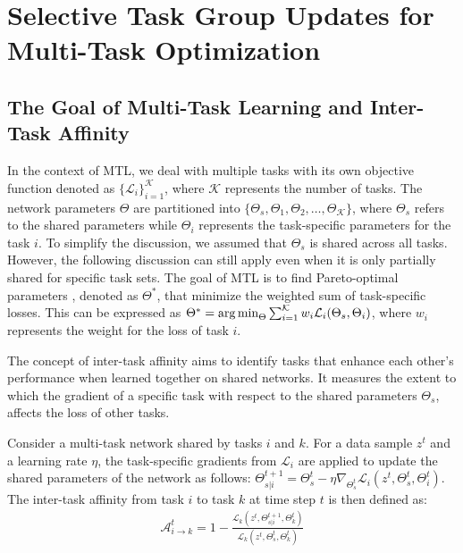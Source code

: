 \section{Selective Task Group Updates for Multi-Task Optimization}
\subsection{The Goal of Multi-Task Learning and Inter-Task Affinity}
\label{sec:problem_def}
In the context of MTL, we deal with multiple tasks with its own objective function denoted as $\{\mathcal{L}_i\}_{i=1}^{\mathcal{K}}$, where $\mathcal{K}$ represents the number of tasks. The network parameters $\Theta$ are partitioned into $\{\Theta_s, \Theta_1, \Theta_2, \ldots, \Theta_\mathcal{K}\}$, where $\Theta_s$ refers to the shared parameters while $\Theta_i$ represents the task-specific parameters for the task $i$. To simplify the discussion, we assumed that $\Theta_s$ is shared across all tasks. However, the following discussion can still apply even when it is only partially shared for specific task sets. The goal of MTL is to find Pareto-optimal parameters \citep{RN36}, denoted as $\Theta^*$, that minimize the weighted sum of task-specific losses. This can be expressed as $\Theta^* = \operatorname*{arg\,min}_{\Theta}\sum_{i=1}^{\mathcal{K}} w_i\mathcal{L}_i(\Theta_s, \Theta_i)$, where $w_i$ represents the weight for the loss of task $i$.

The concept of inter-task affinity \citep{fifty2021efficiently} aims to identify tasks that enhance each other's performance when learned together on shared networks. It measures the extent to which the gradient of a specific task with respect to the shared parameters $\Theta_s$, affects the loss of other tasks.

\begin{definition} Consider a multi-task network shared by tasks $i$ and $k$. For a data sample $z^t$ and a learning rate $\eta$, the task-specific gradients from $\mathcal{L}_i$ are applied to update the shared parameters of the network as follows: $\Theta_{s|i}^{t+1} = \Theta_s^t -\eta \nabla_{\Theta_s^t} \mathcal{L}_i (z^t, \Theta_s^t, \Theta_i^t)$. The inter-task affinity from task $i$ to task $k$ at time step $t$ is then defined as:
\begin{align}
    \mathcal{A}^t_{i\rightarrow k} = 1- \frac{\mathcal{L}_k(z^t, \Theta_{s|i}^{t+1}, \Theta_k^t)}{\mathcal{L}_k(z^t, \Theta_{s}^{t}, \Theta_k^t)}
    \label{definition:inter_task_affinity}
\end{align}
\end{definition}

